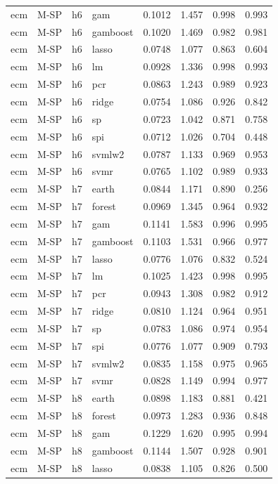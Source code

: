 \begin{ThreePartTable}
\begin{longtable}[t]{llclcccc}
ecm & M-SP & h6 & gam & 0.1012 & 1.457 & 0.998 & 0.993\\
ecm & M-SP & h6 & gamboost & 0.1020 & 1.469 & 0.982 & 0.981\\
ecm & M-SP & h6 & lasso & 0.0748 & 1.077 & 0.863 & 0.604\\
ecm & M-SP & h6 & lm & 0.0928 & 1.336 & 0.998 & 0.993\\
ecm & M-SP & h6 & pcr & 0.0863 & 1.243 & 0.989 & 0.923\\
ecm & M-SP & h6 & ridge & 0.0754 & 1.086 & 0.926 & 0.842\\
ecm & M-SP & h6 & sp & 0.0723 & 1.042 & 0.871 & 0.758\\
ecm & M-SP & h6 & spi & 0.0712 & 1.026 & 0.704 & 0.448\\
ecm & M-SP & h6 & svmlw2 & 0.0787 & 1.133 & 0.969 & 0.953\\
ecm & M-SP & h6 & svmr & 0.0765 & 1.102 & 0.989 & 0.933\\
\addlinespace
ecm & M-SP & h7 & earth & 0.0844 & 1.171 & 0.890 & 0.256\\
ecm & M-SP & h7 & forest & 0.0969 & 1.345 & 0.964 & 0.932\\
ecm & M-SP & h7 & gam & 0.1141 & 1.583 & 0.996 & 0.995\\
ecm & M-SP & h7 & gamboost & 0.1103 & 1.531 & 0.966 & 0.977\\
ecm & M-SP & h7 & lasso & 0.0776 & 1.076 & 0.832 & 0.524\\
ecm & M-SP & h7 & lm & 0.1025 & 1.423 & 0.998 & 0.995\\
ecm & M-SP & h7 & pcr & 0.0943 & 1.308 & 0.982 & 0.912\\
ecm & M-SP & h7 & ridge & 0.0810 & 1.124 & 0.964 & 0.951\\
ecm & M-SP & h7 & sp & 0.0783 & 1.086 & 0.974 & 0.954\\
ecm & M-SP & h7 & spi & 0.0776 & 1.077 & 0.909 & 0.793\\
ecm & M-SP & h7 & svmlw2 & 0.0835 & 1.158 & 0.975 & 0.965\\
ecm & M-SP & h7 & svmr & 0.0828 & 1.149 & 0.994 & 0.977\\
\addlinespace
ecm & M-SP & h8 & earth & 0.0898 & 1.183 & 0.881 & 0.421\\
ecm & M-SP & h8 & forest & 0.0973 & 1.283 & 0.936 & 0.848\\
ecm & M-SP & h8 & gam & 0.1229 & 1.620 & 0.995 & 0.994\\
ecm & M-SP & h8 & gamboost & 0.1144 & 1.507 & 0.928 & 0.901\\
ecm & M-SP & h8 & lasso & 0.0838 & 1.105 & 0.826 & 0.500\\

\end{longtable}
\end{ThreePartTable}
